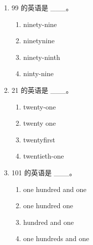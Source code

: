 \documentclass[11pt,a4paper]{ctexart}
\begin{document}
\begin{enumerate}[leftmargin=*,itemsep=4pt]
\item 99 的英语是 \_\_\_。
\begin{enumerate}[label=\Alph*.,leftmargin=2em,itemsep=1pt,topsep=2pt]
\item ninety-nine
\item ninetynine
\item ninety-ninth
\item ninty-nine
\end{enumerate}
\item 21 的英语是 \_\_\_。
\begin{enumerate}[label=\Alph*.,leftmargin=2em,itemsep=1pt,topsep=2pt]
\item twenty-one
\item twenty one
\item twentyfirst
\item twentieth-one
\end{enumerate}
\item 101 的英语是 \_\_\_。
\begin{enumerate}[label=\Alph*.,leftmargin=2em,itemsep=1pt,topsep=2pt]
\item one hundred and one
\item one hundred one
\item hundred and one
\item one hundreds and one
\end{enumerate}
\end{enumerate}
\end{document}
